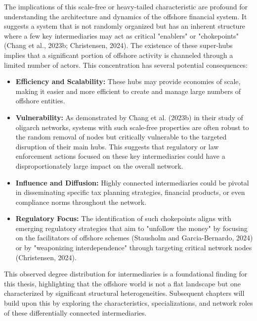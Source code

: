 The implications of this scale-free or heavy-tailed characteristic are profound for understanding the architecture and dynamics of the offshore financial system. It suggests a system that is not randomly organized but has an inherent structure where a few key intermediaries may act as critical "enablers" or "chokepoints" (Chang et al., 2023b; Christensen, 2024). The existence of these super-hubs implies that a significant portion of offshore activity is channeled through a limited number of actors. This concentration has several potential consequences:
\begin{itemize}
    \item \textbf{Efficiency and Scalability:} These hubs may provide economies of scale, making it easier and more efficient to create and manage large numbers of offshore entities.
    \item \textbf{Vulnerability:} As demonstrated by Chang et al. (2023b) in their study of oligarch networks, systems with such scale-free properties are often robust to the random removal of nodes but critically vulnerable to the targeted disruption of their main hubs. This suggests that regulatory or law enforcement actions focused on these key intermediaries could have a disproportionately large impact on the overall network.
    \item \textbf{Influence and Diffusion:} Highly connected intermediaries could be pivotal in disseminating specific tax planning strategies, financial products, or even compliance norms throughout the network.
    \item \textbf{Regulatory Focus:} The identification of such chokepoints aligns with emerging regulatory strategies that aim to "unfollow the money" by focusing on the facilitators of offshore schemes (Stausholm and Garcia-Bernardo, 2024) or by "weaponizing interdependence" through targeting critical network nodes (Christensen, 2024).
\end{itemize}
This observed degree distribution for intermediaries is a foundational finding for this thesis, highlighting that the offshore world is not a flat landscape but one characterized by significant structural heterogeneities. Subsequent chapters will build upon this by exploring the characteristics, specializations, and network roles of these differentially connected intermediaries.

